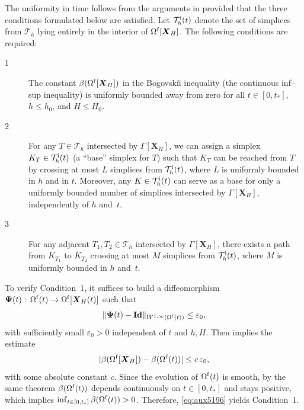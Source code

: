 \documentclass[11pt,reqno]{amsart}
\theoremstyle{definition}
\theoremstyle{plain}
\numberwithin{theorem}{section}
\numberwithin{proposition}{section}
\numberwithin{lemma}{section}
\numberwithin{equation}{section}
\newcommand{\bs}[1]{\boldsymbol{#1}}
\newcommand{\eps}   {\varepsilon}
\renewcommand{\(}{\bigl(}
\renewcommand{\)}{\bigr)}
\newcommand{\bX}{{\bm X}}
\begin{document}
The uniformity  in time  follows from the arguments in \cite{GuzmOlsh} provided that the three 
conditions formulated below are satisfied. Let ${\mathcal T}_h^{\rm i}(t)$ denote the set of 
simplices from ${\mathcal T}_h$ lying entirely in the interior of 
$\Omega^{\rm f}[{\bs X}_H]$. The following conditions are required:
\begin{description}
  \item[1] The constant $\beta(\Omega^{\rm f}[{\bs X}_H])$ in the Bogovski\u{\i} inequality 
  (the continuous inf--sup inequality) is uniformly bounded away from zero for all 
  $t\in[0,t_*]$, $h\le h_0$, and $H\le H_0$.

  \item[2] For any $T\in {\mathcal T}_h$ intersected by $\Gamma[\bX_H]$, we can assign a simplex $K_T\in {\mathcal T}_h^{\rm i}(t)$ (a ``base'' simplex for $T$) such that $K_T$ can be 
  reached from $T$ by crossing at most $L$ simplices from ${\mathcal T}_h^{\rm i}(t)$, where $L$ 
  is uniformly bounded in $h$ and in $t$. Moreover, any $K\in {\mathcal T}_h^{\rm i}(t)$ can 
  serve as a base for only a uniformly bounded number of simplices intersected by 
  $\Gamma[\bX_H]$, independently of $h$ and~$t$.

  \item[3] For any adjacent $T_1,T_2\in {\mathcal T}_h$ intersected by $\Gamma[\bX_H]$, there 
  exists a path from $K_{T_1}$ to $K_{T_2}$ crossing at most $M$ simplices from 
  ${\mathcal T}_h^{\rm i}(t)$, where $M$ is uniformly bounded in $h$ and~$t$.
\end{description}

To verify Condition~1, %
it suffices to build a diffeomorphism ${\bs\Psi}(t):\,\Omega^{\rm f}(t)\to\Omega^{\rm f}[{\bs X}_H(t)]$ such 
that 
\begin{equation}\label{eq:aux5191}
\|{\bs\Psi}(t)-\mathbf{Id}\|_{W^{1,\infty}(\Omega^{\rm f}(t))} \le \eps_0,
\end{equation}
with sufficiently small $\eps_0>0$ independent of $t$ and $h,H$.  Then  \cite[Theorem~4.4]{bernardi2016continuity} implies the estimate
\begin{equation}\label{eq:aux5196}
|\beta(\Omega^{\rm f}[{\bs X}_H])-\beta(\Omega^{\rm f}(t))|\le c\,\eps_0,
\end{equation}
with some absolute constant $c$. Since the evolution of $\Omega^{\rm f}(t)$ is smooth, by the same theorem $\beta(\Omega^{\rm f}(t))$ depends continuously on $t\in[0,t_*]$ and stays positive, which implies $\inf_{t\in[0,t_*]}\beta(\Omega^{\rm f}(t))>0$. Therefore, \eqref{eq:aux5196} yields Condition~1.  
\end{document}
